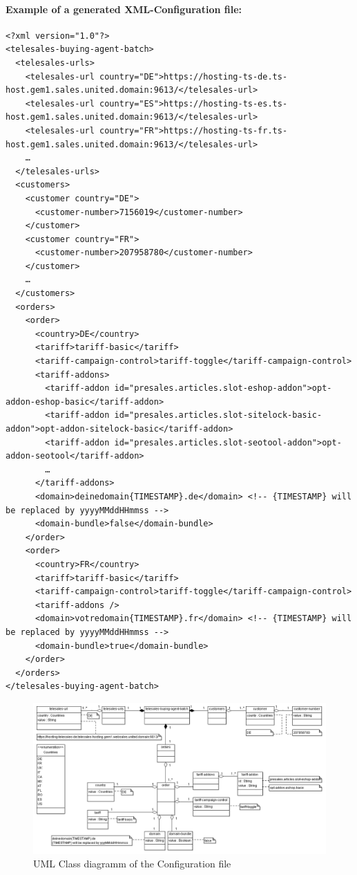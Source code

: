 \begin{landscape}
\paragraph{Example of a generated XML-Configuration file:}
\begin{verbatim}
<?xml version="1.0"?>
<telesales-buying-agent-batch>
  <telesales-urls>
    <telesales-url country="DE">https://hosting-ts-de.ts-host.gem1.sales.united.domain:9613/</telesales-url>
    <telesales-url country="ES">https://hosting-ts-es.ts-host.gem1.sales.united.domain:9613/</telesales-url>
    <telesales-url country="FR">https://hosting-ts-fr.ts-host.gem1.sales.united.domain:9613/</telesales-url>
    …
  </telesales-urls>
  <customers>
    <customer country="DE">
      <customer-number>7156019</customer-number>
    </customer>
    <customer country="FR">
      <customer-number>207958780</customer-number>
    </customer>
    …
  </customers>
  <orders>
    <order>
      <country>DE</country>
      <tariff>tariff-basic</tariff>
      <tariff-campaign-control>tariff-toggle</tariff-campaign-control>
      <tariff-addons>
        <tariff-addon id="presales.articles.slot-eshop-addon">opt-addon-eshop-basic</tariff-addon>
        <tariff-addon id="presales.articles.slot-sitelock-basic-addon">opt-addon-sitelock-basic</tariff-addon>
        <tariff-addon id="presales.articles.slot-seotool-addon">opt-addon-seotool</tariff-addon>
        …
      </tariff-addons>
      <domain>deinedomain{TIMESTAMP}.de</domain> <!-- {TIMESTAMP} will be replaced by yyyyMMddHHmmss -->
      <domain-bundle>false</domain-bundle>
    </order>
    <order>
      <country>FR</country>
      <tariff>tariff-basic</tariff>
      <tariff-campaign-control>tariff-toggle</tariff-campaign-control>
      <tariff-addons />
      <domain>votredomain{TIMESTAMP}.fr</domain> <!-- {TIMESTAMP} will be replaced by yyyyMMddHHmmss -->
      <domain-bundle>true</domain-bundle>
    </order>
  </orders>
</telesales-buying-agent-batch>
\end{verbatim}

\begin{figure}[h!]
\centering
\includegraphics[width=\textwidth]{d_class_batch.png}
\caption{UML Class diagramm of the Configuration file}
\end{figure}

\end{landscape}

